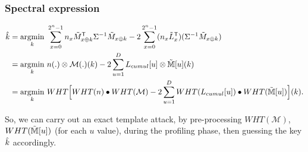 \documentclass{beamer}
\DeclareMathOperator*\argmin{argmin}
\begin{document}



\begin{frame}

\frametitle{Spectral expression}

\begin{small}
\begin{align*}
\Hat{k} = \argmin_k& \  \sum_{x=0}^{2^n-1} n_x \Tilde{M}^\mathsf{T}_{x \oplus k} \Sigma^{-1}  \Tilde{M}_{x \oplus k} - 2\sum_{x=0}^{2^n-1}(n_x \Tilde{L}^\mathsf{T}_x)(\Sigma^{-1}\Tilde{M}_{x\oplus k}) \\
=\argmin_k & \  n(.)\otimes \mathcal{M}(.)(k) -2 \sum_{u=1}^{D} L_{cumul}[u] \otimes \Tilde{\mathbb{M}}[u](k)\\
=\argmin_k & \  WHT\Big[WHT(n) \bullet WHT(\mathcal{M})  -2\sum_{u=1}^{D} WHT(L_{cumul}[u]) \bullet WHT(\Tilde{\mathbb{M}}[u])\Big](k).
\end{align*} 
\end{small}

\pause 

So, we can carry out an exact template attack, by pre-processing $WHT(\mathcal{M})$, $WHT(\Tilde{\mathbb{M}}[u])$ (for each $u$ value), during the profiling phase, then guessing the key $\Hat{k}$ accordingly.

\end{frame}
\end{document}
